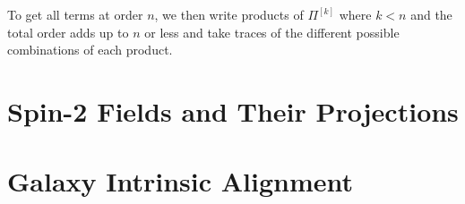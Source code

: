 \documentclass[11pt]{article}
\begin{document}
To get all terms at order $n$, we then write products of $\Pi^{[k]}$ where $k<n$ and the total order adds up to $n$ or less and take traces of the different possible combinations of each product. %

\section{Spin-2 Fields and Their Projections}

\section{Galaxy Intrinsic Alignment}
\label{sec:galaxyintrinsicalignment}



\printbibliography
\end{document}
